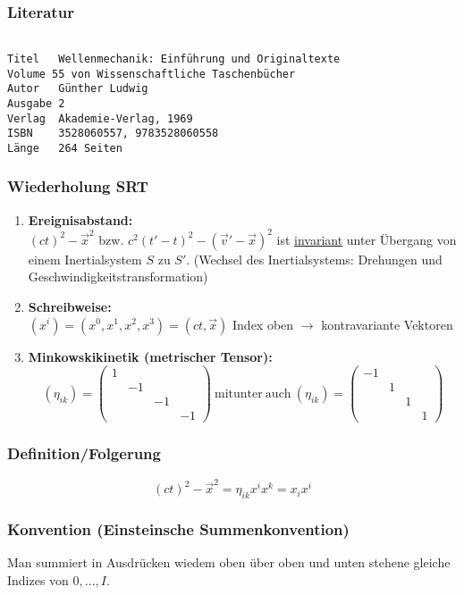 \documentclass[twoside,a4paper]{scrartcl}
\renewcommand{\1}{\mathds{1}}
\newcommand{\ra}{\rightarrow}
\begin{document}
\subsubsection*{Literatur}
\begin{tiny}
\begin{verbatim}

Titel	Wellenmechanik: Einführung und Originaltexte
Volume 55 von Wissenschaftliche Taschenbücher
Autor	Günther Ludwig
Ausgabe	2
Verlag	Akademie-Verlag, 1969
ISBN	3528060557, 9783528060558
Länge	264 Seiten
\end{verbatim}
\end{tiny}


\subsubsection{Wiederholung SRT}
\begin{enumerate}
\item \textbf{Ereignisabstand:}\\
$(ct)^2-\vec x^2$ bzw. $c^2(t'-t)^2-(\vec v'-\vec x)^2$ ist \underline{invariant} unter Übergang von einem Inertialsystem $S$ zu $S'$. (Wechsel des Inertialsystems: Drehungen und Geschwindigkeitstransformation)
\item \textbf{Schreibweise:}\\
$(x^i)=(x^0,x^1,x^2,x^3)=(ct,\vec x)$ Index oben $\ra$ kontravariante Vektoren
\item \textbf{Minkowskikinetik (metrischer Tensor):}\\
$$(\eta_{ik})=\begin{pmatrix}1 \\ & -1 \\ & & -1 \\ & & & -1\end{pmatrix} \ \mathrm{mitunter \ auch \ } (\eta_{ik})=\begin{pmatrix}-1 \\ & 1 \\ & & 1 \\ & & & 1\end{pmatrix}$$
\end{enumerate}
\subsubsection*{Definition/Folgerung}
$$(ct)^2-\vec x^2= \eta_{ik} x^ix^k=x_ix^i$$
\subsubsection*{Konvention (Einsteinsche Summenkonvention)}
Man summiert in Ausdrücken wiedem oben über oben und unten stehene gleiche Indizes von $0,...,I$.
\end{document}
